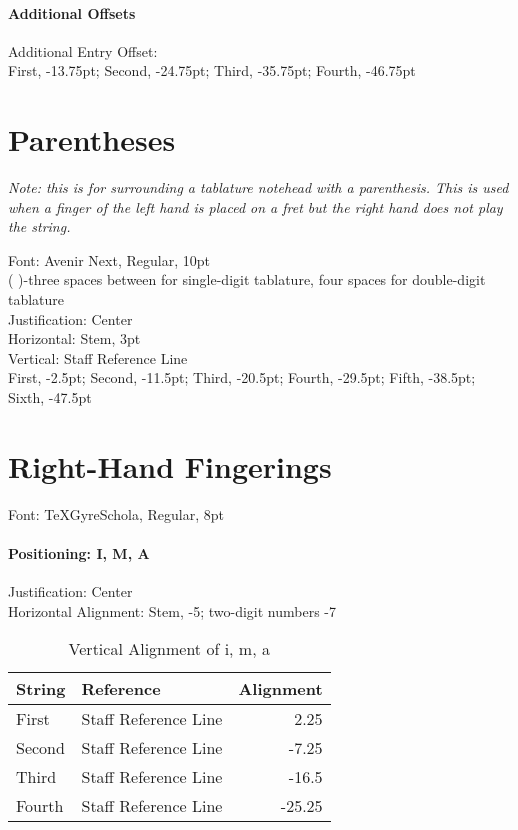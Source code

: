 \documentclass[]{memoir}
\begin{document}
\paragraph{Additional Offsets}
\label{sec:additional-offsets}

Additional Entry Offset:\\
\indent First, -13.75pt; Second, -24.75pt; Third, -35.75pt; Fourth, -46.75pt

\section{Parentheses}
\label{sec:parentheses}

\emph{Note: this is for surrounding a tablature notehead with a parenthesis. This is used when a finger of the left hand is placed on a fret but the right hand does not play the string.}

Font: Avenir Next, Regular, 10pt\\
(   )-three spaces between for single-digit tablature, four spaces for double-digit tablature\\
Justification: Center\\
Horizontal: Stem, 3pt\\
Vertical: Staff Reference Line\\
\indent First, -2.5pt; Second, -11.5pt; Third, -20.5pt; Fourth, -29.5pt; Fifth, -38.5pt; Sixth, -47.5pt

\section{Right-Hand Fingerings}
\label{sec:right-hand-fing}

Font: TeXGyreSchola, Regular, 8pt\\

\paragraph{Positioning: I, M, A}
\label{sec:positioning:-i-m}

Justification: Center\\
Horizontal Alignment: Stem, -5; two-digit numbers -7\\

\begin{table}[h!]
  \centering
  \begin{tabular}{l l r}
    String & Reference & Alignment\\\hline
    First & Staff Reference Line & 2.25\\
    Second & Staff Reference Line & -7.25\\
    Third & Staff Reference Line & -16.5\\
    Fourth & Staff Reference Line & -25.25\\
\end{tabular}
\caption{Vertical Alignment of i, m, a}
\end{table}
\end{document}
